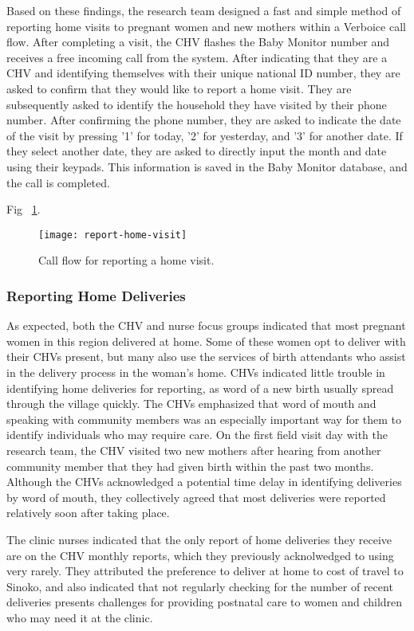 Based on these findings, the research team designed a fast and simple method of reporting home visits to pregnant women and new mothers within a Verboice call flow. After completing a visit, the CHV flashes the Baby Monitor number and receives a free incoming call from the system. After indicating that they are a CHV  and identifying themselves with their unique national ID number, they are asked to confirm that they would like to report a home visit. They are subsequently asked to identify the household they have visited by their phone number. After confirming the phone number, they are asked to indicate the date of the visit by pressing '1' for today, '2' for yesterday, and '3' for another date. If they select another date, they are asked to directly input the month and date using their keypads. This information is saved in the Baby Monitor database, and the call is completed. 

Fig ~\ref{fig:homevisit}.
\begin{figure}[]
	\begin{center}
	\texttt{[image: report-home-visit]}
	\end{center}
	\caption{Call flow for reporting a home visit.}
	\label{fig:homevisit}
\end{figure}

\subsubsection{Reporting Home Deliveries}
As expected, both the CHV and nurse focus  groups indicated that most pregnant women in this region delivered at home. Some of these women opt to deliver with their CHVs present, but many also use the services of birth attendants who assist in the delivery process in the woman's home. CHVs indicated little trouble in identifying home deliveries for reporting, as word of a new birth usually spread through the village quickly. The CHVs emphasized that word of mouth and  speaking with community members was an especially important way for them to identify individuals who may require care. On the first field visit day with the research team, the CHV visited  two new mothers after hearing from another community member that they had given birth within the past two months. Although the CHVs acknowledged a potential time delay in identifying deliveries by word of mouth, they collectively agreed that most deliveries were reported relatively soon after taking place. 

The clinic nurses indicated that the only report of home deliveries they receive are on the CHV monthly reports, which they previously acknolwedged to using very rarely. They attributed the preference to deliver at home to cost of travel to Sinoko, and also indicated that not regularly checking for the number of recent deliveries presents challenges for providing postnatal care to women and children who may need it at the clinic. 

